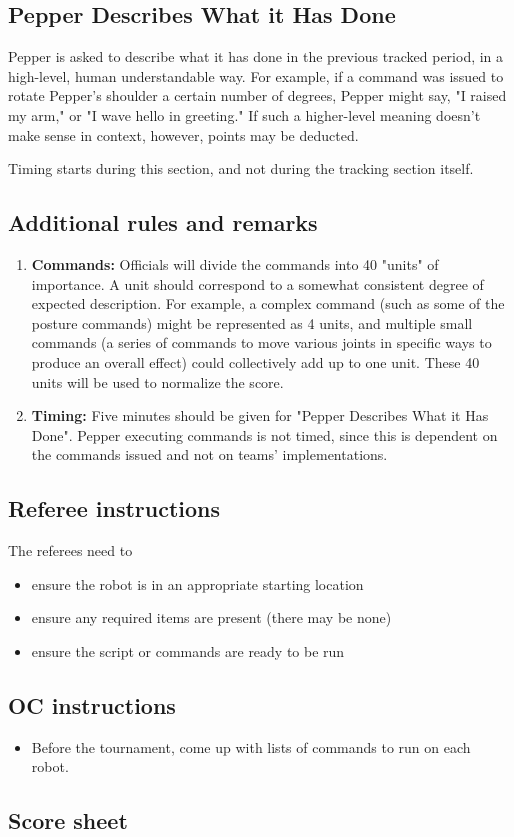 \subsection{Pepper Describes What it Has Done}
Pepper is asked to describe what it has done in the previous tracked period, in a high-level, human understandable way.  For example, if a command was issued to rotate Pepper's shoulder a certain number of degrees, Pepper might say, "I raised my arm," or "I wave hello in greeting."  If such a higher-level meaning doesn't make sense in context, however, points may be deducted.

Timing starts during this section, and not during the tracking section itself.

\subsection{Additional rules and remarks}
\begin{enumerate}
	\item \textbf{Commands:} Officials will divide the commands into 40 "units" of importance.  A unit should correspond to a somewhat consistent degree of expected description.  For example, a complex command (such as some of the posture commands) might be represented as 4 units, and multiple small commands (a series of commands to move various joints in specific ways to produce an overall effect) could collectively add up to one unit.   These 40 units will be used to normalize the score.

	\item \textbf{Timing:} Five minutes should be given for "Pepper Describes What it Has Done".  Pepper executing commands is not timed, since this is dependent on the commands issued and not on teams' implementations.

\end{enumerate}

\subsection{Referee instructions}

The referees need to
\begin{itemize}
	\item ensure the robot is in an appropriate starting location
	\item ensure any required items are present (there may be none)
    \item ensure the script or commands are ready to be run
\end{itemize}

\subsection{OC instructions}

\begin{itemize}
	\item Before the tournament, come up with lists of commands to run on each robot.
\end{itemize}

\newpage
\subsection{Score sheet}

